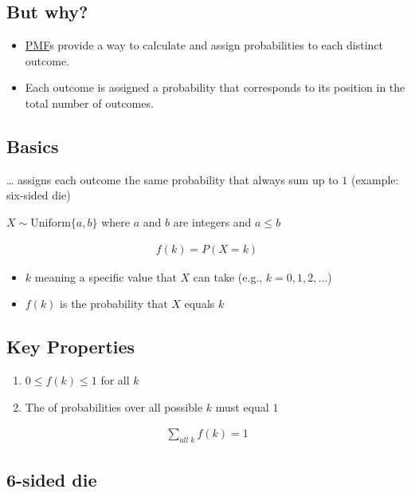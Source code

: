 \documentclass[
  a4paper,
]{scrbook}
\providecommand{\tightlist}{%
  \setlength{\itemsep}{0pt}\setlength{\parskip}{0pt}}\usepackage{longtable,booktabs,array}
\begin{document}
\subsection{But why?}\label{but-why}

\begin{itemize}
\tightlist
\item
  \hyperref[acronyms_PMF]{PMF}s provide a way to calculate and assign
  probabilities to each distinct outcome.
\item
  Each outcome is assigned a probability that corresponds to its
  position in the total number of outcomes.
\end{itemize}

\subsection{Basics}\label{basics}

\ldots{} assigns each outcome the same probability that always sum up to
\(1\) (example: six-sided die)

\(X \sim \mathrm{Uniform}\{a,b\}\) where \(a\) and \(b\) are integers
and \(a\leq b\)

\begin{align}
f(k) = P (X = k)
\end{align}

\begin{itemize}
\tightlist
\item
  \(k\) meaning a specific value that \(X\) can take (e.g.,
  \(k = 0,1,2, ...\))
\item
  \(f(k)\) is the probability that \(X\) equals \(k\)
\end{itemize}

\subsection{Key Properties}\label{key-properties}

\begin{enumerate}
\def\labelenumi{\arabic{enumi}.}
\tightlist
\item
  \(0 \leq f(k) \leq 1\) for all \(k\)
\item
  The of probabilities over all possible \(k\) must equal \(1\)
\end{enumerate}

\begin{align}
\sum_{all \; k}f(k) = 1
\end{align}

\subsection{6-sided die}\label{sided-die}
\end{document}
